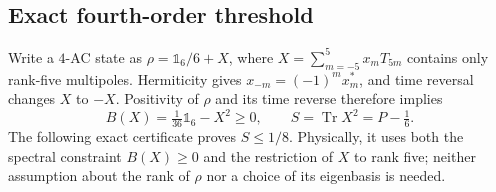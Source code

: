 \documentclass[11pt]{article}
\DeclareMathOperator{\Tr}{Tr}
\begin{document}
\subsection{Exact fourth-order threshold}
\label{app:spin52_purity4}
Write a $4$-AC state as $\rho=\mathbb 1_6/6+X$, where
$X=\sum_{m=-5}^{5}x_mT_{5m}$ contains only rank-five multipoles.
Hermiticity gives $x_{-m}=(-1)^mx_m^*$, and time reversal changes
$X$ to $-X$. Positivity of $\rho$ and its time reverse therefore implies
\begin{equation}
 B(X)=\tfrac1{36}\mathbb 1_6-X^2\ge0,\qquad
 S=\Tr X^2=P-\tfrac16.
\end{equation}
The following exact certificate proves $S\le1/8$. Physically, it uses
both the spectral constraint $B(X)\ge0$ and the restriction of $X$ to
rank five; neither assumption about the rank of $\rho$ nor a choice of
its eigenbasis is needed.
\end{document}
